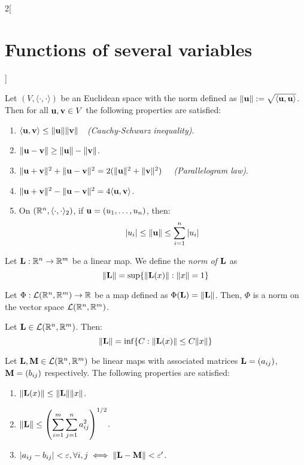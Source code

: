 \documentclass[../../../main.tex]{subfiles}
\begin{document}
\begin{multicols}{2}[\section{Functions of several variables}]
\begin{corollary}
  \end{corollary}
  \begin{prop}
    Let $(V,\langle\cdot,\cdot\rangle)$ be an Euclidean space with the norm defined as $\|\boldsymbol{\mathrm{u}}\|:=\sqrt{\langle \boldsymbol{\mathrm{u}},\boldsymbol{\mathrm{u}}\rangle}$. Then for all $\boldsymbol{\mathrm{u}},\boldsymbol{\mathrm{v}}\in V$ the following properties are satisfied:
    \begin{enumerate}
      \item $\langle \boldsymbol{\mathrm{u}},\boldsymbol{\mathrm{v}}\rangle\leq\|\boldsymbol{\mathrm{u}}\|\|\boldsymbol{\mathrm{v}}\|\quad$\textit{(Cauchy-Schwarz inequality)}.
      \item $\|\boldsymbol{\mathrm{u}}-\boldsymbol{\mathrm{v}}\|\geq\|\boldsymbol{\mathrm{u}}\|-\|\boldsymbol{\mathrm{v}}\|$.
      \item $\|\boldsymbol{\mathrm{u}}+\boldsymbol{\mathrm{v}}\|^2+\|\boldsymbol{\mathrm{u}}-\boldsymbol{\mathrm{v}}\|^2=2(\|\boldsymbol{\mathrm{u}}\|^2+\|\boldsymbol{\mathrm{v}}\|^2)\quad$ \textit{(Parallelogram law)}.
      \item $\|\boldsymbol{\mathrm{u}}+\boldsymbol{\mathrm{v}}\|^2-\|\boldsymbol{\mathrm{u}}-\boldsymbol{\mathrm{v}}\|^2=4\langle \boldsymbol{\mathrm{u}},\boldsymbol{\mathrm{v}}\rangle$.
      \item On $(\mathbb{R}^n,\langle\cdot,\cdot\rangle_2)$, if $\boldsymbol{\mathrm{u}}=(u_1,\ldots,u_n)$, then: $$|u_i|\leq\|\boldsymbol{\mathrm{u}}\|\leq\sum_{i=1}^n|u_i|$$
    \end{enumerate}
  \end{prop}
  \begin{definition}
    Let $\boldsymbol{\mathrm{L}}:\mathbb{R}^n\rightarrow\mathbb{R}^m$ be a linear map. We define the \textit{norm of $\boldsymbol{\mathrm{L}}$} as $$\|\boldsymbol{\mathrm{L}}\|=\sup\{\|\boldsymbol{\mathrm{L}}(x)\|:\|x\|=1\}$$
  \end{definition}
  \begin{lemma}
    Let $\Phi:\mathcal{L}(\mathbb{R}^n,\mathbb{R}^m)\rightarrow\mathbb{R} $ be a map defined as $\Phi(\boldsymbol{\mathrm{L}})=\|\boldsymbol{\mathrm{L}}\|$. Then, $\Phi$ is a norm on the vector space $\mathcal{L}(\mathbb{R}^n,\mathbb{R}^m)$.
  \end{lemma}
  \begin{prop}
    Let $\boldsymbol{\mathrm{L}}\in\mathcal{L}(\mathbb{R}^n,\mathbb{R}^m)$. Then: $$\|\boldsymbol{\mathrm{L}}\|=\inf\{C:\|\boldsymbol{\mathrm{L}}(x)\|\leq C\|x\|\}$$
  \end{prop}
  \begin{corollary}
    Let $\boldsymbol{\mathrm{L}},\boldsymbol{\mathrm{M}}\in\mathcal{L}(\mathbb{R}^n,\mathbb{R}^m)$ be linear maps with associated matrices $\boldsymbol{\mathrm{L}}=(a_{ij})$, $\boldsymbol{\mathrm{M}}=(b_{ij})$ respectively. The following properties are satisfied:
    \begin{enumerate}
      \item $\|\boldsymbol{\mathrm{L}}(x)\|\leq\|\boldsymbol{\mathrm{L}}\|\|x\|$.
      \item $\displaystyle\|\boldsymbol{\mathrm{L}}\|\leq\left(\sum_{i=1}^m\sum_{j=1}^na_{ij}^2\right)^{1/2}$.
      \item $|a_{ij}-b_{ij}|<\varepsilon,\forall i,j\iff\|\boldsymbol{\mathrm{L}}-\boldsymbol{\mathrm{M}}\|<\varepsilon'$.

\end{enumerate}
\end{corollary}
\end{multicols}
\end{document}
